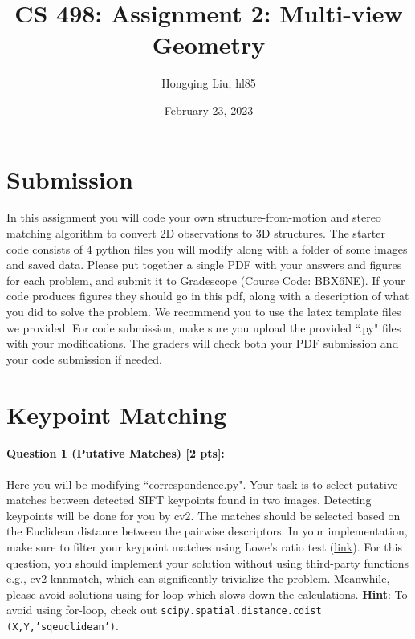 \documentclass[11pt]{article}
\begin{document}
\author{Hongqing Liu, hl85}
\title{CS 498: Assignment 2: Multi-view Geometry}
\date{February 23, 2023}
\maketitle

\medskip


\section*{Submission}
In this assignment you will code your own structure-from-motion and stereo matching algorithm to convert 2D observations to 3D structures. The starter code consists of 4 python files you will modify along with a folder of some images and saved data. Please put together a single PDF with your answers and figures for each problem, and submit it to Gradescope (Course Code: BBX6NE). If your code produces figures they should go in this pdf, along with a description of what you did to solve the problem. We recommend you to use the latex template files we provided. For code submission, make sure you upload the provided ``.py" files with your modifications. The graders will check both your PDF submission and your code submission if needed. 

\section*{Keypoint Matching} 
\paragraph{Question 1 (Putative Matches) [2 pts]:} Here you will be modifying ``correspondence.py". Your task is to select putative matches between detected SIFT keypoints found in two images. Detecting keypoints will be done for you by cv2. The matches should be selected based on the Euclidean distance between the pairwise descriptors. In your implementation, make sure to filter your keypoint matches using Lowe's ratio test (\href{https://stackoverflow.com/questions/51197091/how-does-the-lowes-ratio-test-work}{link}).  For this question, you should implement your solution without using third-party functions e.g., cv2 knnmatch, which can significantly trivialize the problem. Meanwhile, please avoid solutions using for-loop which slows down the calculations. \textbf{Hint}: To avoid using for-loop, check out \texttt{scipy.spatial.distance.cdist (X,Y,'sqeuclidean')}.
\end{document}
